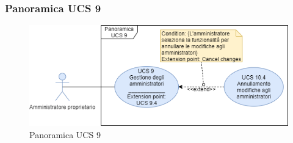 \subsubsection{Panoramica UCS 9}%
\begin{figure}[h]
  \centering
    \includegraphics[scale=0.5]{Sezioni/UseCase/Immagini/PanoramicaUCS9.png}
  \caption{Panoramica UCS 9}
\end{figure}

